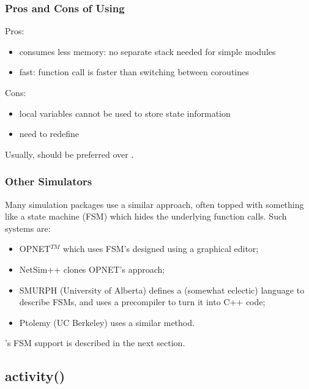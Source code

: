 \subsubsection{Pros and Cons of Using }


Pros:
\begin{itemize}
  \item{consumes less memory: no separate stack needed for simple modules}
  \item{fast: function call is faster than switching between coroutines}
\end{itemize}

Cons:
\begin{itemize}
  \item{local variables cannot be used to store state information}
  \item{need to redefine }
\end{itemize}

Usually,  should be preferred over .


\subsubsection{Other Simulators}


Many simulation packages use a similar approach, often topped with
something like a state machine
(FSM) which hides the underlying function calls. Such
systems are:
\begin{itemize}
  \item{OPNET$^{TM}$ which uses FSM's designed using a graphical editor;}
  \item{NetSim++ clones OPNET's approach;}
  \item{SMURPH (University of Alberta) defines a (somewhat eclectic)
      language to describe FSMs, and uses a precompiler to turn it
      into C++ code;}
  \item{Ptolemy (UC Berkeley) uses a similar method.}
\end{itemize}

{\opp}'s FSM support is described in the next section.



\subsection{activity()}
\label{sec:simple-modules:activity}


